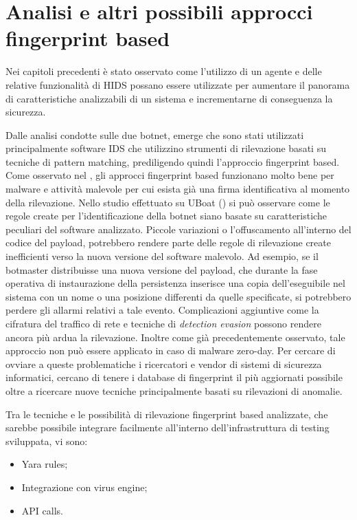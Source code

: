 \chapter{Analisi e altri possibili approcci fingerprint based}

Nei capitoli precedenti è stato osservato  come l'utilizzo di un agente  e delle relative funzionalità di HIDS possano essere utilizzate per  aumentare il panorama di caratteristiche analizzabili di un sistema e incrementarne di conseguenza la sicurezza.

Dalle analisi condotte sulle due botnet, emerge che sono stati utilizzati principalmente software IDS che utilizzino strumenti di rilevazione basati su tecniche di pattern matching, prediligendo quindi l'approccio fingerprint based.
Come osservato nel , gli approcci fingerprint based funzionano molto bene per malware e attività malevole per cui esista già una firma identificativa al momento della rilevazione. Nello studio  effettuato su UBoat () si può osservare come le regole create per l'identificazione della botnet siano basate su caratteristiche peculiari del software analizzato. Piccole variazioni o l'offuscamento all'interno del codice del  payload, potrebbero rendere parte delle regole di rilevazione create inefficienti verso la nuova versione del software malevolo. Ad esempio, se il botmaster distribuisse una nuova versione del payload, che durante la fase operativa di instaurazione della persistenza inserisce una copia dell'eseguibile nel sistema con un nome o una posizione differenti da quelle specificate, si potrebbero perdere gli allarmi relativi a tale evento.
Complicazioni aggiuntive come la cifratura del traffico di rete e tecniche di \textit{detection evasion} possono rendere ancora più ardua la rilevazione.
Inoltre come già precedentemente osservato, tale approccio non può essere applicato in caso di malware zero-day. Per cercare di ovviare a queste problematiche i ricercatori e vendor di sistemi di sicurezza informatici, cercano di tenere i database di fingerprint  il più aggiornati possibile oltre a ricercare nuove tecniche principalmente basati su rilevazioni di anomalie.

\medskip
Tra le tecniche e le possibilità di rilevazione  fingerprint based analizzate, che sarebbe possibile integrare facilmente all'interno dell'infrastruttura di testing sviluppata, vi sono:
\begin{itemize}
    \item Yara rules;
    \item Integrazione con virus engine;
    \item API calls.
\end{itemize}

